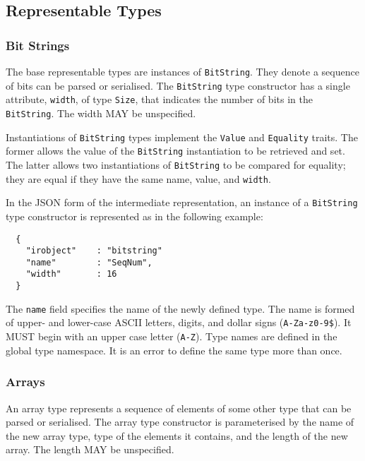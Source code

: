 \documentclass[10pt,twocolumn,a4paper]{article}
\newcommand{\code}[1]{\texttt{#1}}
\begin{document}
\subsection{Representable Types}
\label{sec:representable}


\subsubsection{Bit Strings}
\label{sec:bit-string}

The base representable types are instances of \code{BitString}. They denote
a sequence of bits can be parsed or serialised. The \code{BitString} type
constructor has a single attribute, \code{width}, of type \code{Size}, that
indicates the number of bits in the \code{BitString}. The width MAY be
unspecified.

Instantiations of \code{BitString} types implement the \code{Value} and
\code{Equality} traits. The former allows the value of the \code{BitString}
instantiation to be retrieved and set. The latter allows two instantiations
of \code{BitString} to be compared for equality; they are equal if they
have the same name, value, and \code{width}.

In the JSON form of the intermediate representation, an instance of a
\code{BitString} type constructor is represented as in the following
example:
\footnotesize
\begin{verbatim}
  {
    "irobject"    : "bitstring"
    "name"        : "SeqNum",
    "width"       : 16
  }
\end{verbatim}
\normalsize
The \code{name} field specifies the name of the newly defined type. The
name is formed of upper- and lower-case ASCII letters, digits, and dollar
signs (\code{A-Za-z0-9\$}).  It MUST begin with an upper case letter
(\code{A-Z}). Type names are defined in the global type namespace. 
It is an error to define the same type more than once.

\subsubsection{Arrays}

An array type represents a sequence of elements of some other type that can
be parsed or serialised. The array type constructor is parameterised by the 
name of the new array type, type of the elements it contains, and the length
of the new array. The length MAY be unspecified. 
\end{document}
